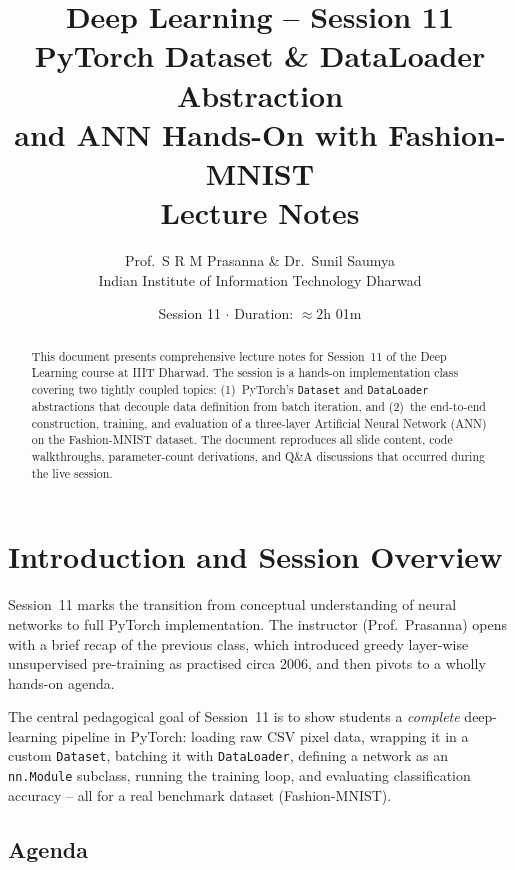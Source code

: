 \documentclass[12pt,a4paper]{article}
\title{%
  \vspace{-1cm}
  {\Large Deep Learning -- Session 11}\\[6pt]
  {\LARGE \textbf{PyTorch Dataset \& DataLoader Abstraction\\
  and ANN Hands-On with Fashion-MNIST}}\\[8pt]
  {\large Lecture Notes}
}
\author{%
  Prof.\ S R M Prasanna \quad \& \quad Dr.\ Sunil Saumya\\[4pt]
  \normalsize Indian Institute of Information Technology Dharwad
}
\date{Session 11 \quad $\cdot$ \quad Duration: $\approx 2$h 01m}
\begin{document}
\maketitle
\thispagestyle{fancy}

\begin{abstract}
This document presents comprehensive lecture notes for Session~11 of the Deep
Learning course at IIIT Dharwad.  The session is a hands-on implementation
class covering two tightly coupled topics: (1)~PyTorch's \texttt{Dataset} and
\texttt{DataLoader} abstractions that decouple data definition from batch
iteration, and (2)~the end-to-end construction, training, and evaluation of a
three-layer Artificial Neural Network (ANN) on the Fashion-MNIST dataset.  The
document reproduces all slide content, code walkthroughs, parameter-count
derivations, and Q\&A discussions that occurred during the live session.
\end{abstract}

\tableofcontents
\newpage

\section{Introduction and Session Overview}
\label{sec:intro}

Session~11 marks the transition from conceptual understanding of neural
networks to full PyTorch implementation.  The instructor (Prof.\ Prasanna)
opens with a brief recap of the previous class, which introduced greedy
layer-wise unsupervised pre-training as practised circa 2006, and then pivots
to a wholly hands-on agenda.

\begin{keyinsight}
The central pedagogical goal of Session~11 is to show students a
\emph{complete} deep-learning pipeline in PyTorch: loading raw CSV pixel data,
wrapping it in a custom \texttt{Dataset}, batching it with \texttt{DataLoader},
defining a network as an \texttt{nn.Module} subclass, running the training
loop, and evaluating classification accuracy -- all for a real benchmark
dataset (Fashion-MNIST).
\end{keyinsight}

\subsection{Agenda}
\end{document}
